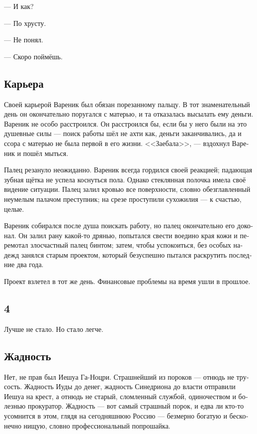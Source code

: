 \documentclass[a5paper,12pt,fleqn]{extbook}\usepackage{cooltooltips}\usepackage{polyglossia}\setdefaultlanguage[babelshorthands=true]{russian}\setotherlanguage{english}\defaultfontfeatures{Ligatures=TeX,Mapping=tex-text} \usepackage{xcolor}\definecolor{lightgray}{HTML}{bbbbbb}\color{lightgray}\newcommand{\ml}[3]{\textenglish{\textcolor{black}{#3}}}
\begin{document}
--- И как?

--- По хрусту.

--- Не понял.

--- Скоро поймёшь.


\subsection{Карьера}

Своей карьерой Вареник был обязан порезанному пальцу.
В тот знаменательный день он окончательно поругался с матерью, и та отказалась высылать ему деньги.
Вареник не особо расстроился.
Он расстроился бы, если бы у него были на это душевные силы --- поиск работы шёл не ахти как, деньги заканчивались, да и ссора с матерью не была первой в его жизни.
<<Заебала>>, --- вздохнул Вареник и пошёл мыться.

Палец резануло неожиданно.
Вареник всегда гордился своей реакцией;
падающая зубная щётка не успела коснуться пола.
Однако стеклянная полочка имела своё видение ситуации.
Палец залил кровью все поверхности, словно обезглавленный неумелым палачом преступник;
на срезе проступили сухожилия --- к счастью, целые.

Вареник собирался после душа поискать работу, но палец окончательно его доконал.
Он залил рану какой-то дрянью, попытался свести воедино края кожи и перемотал злосчастный палец бинтом;
затем, чтобы успокоиться, без особых надежд занялся старым проектом, который безуспешно пытался раскрутить последние два года.

Проект взлетел в тот же день.
Финансовые проблемы на время ушли в прошлое.


\subsection{4}

Лучше не стало.
Но стало легче.

\subsection{Жадность}

Нет, не прав был Иешуа Га-Ноцри.
Страшнейший из пороков --- отнюдь не трусость.
Жадность Иуды до денег, жадность Синедриона до власти отправили Иешуа на крест, а отнюдь не старый, сломленный службой, одиночеством и болезнью прокуратор.
Жадность --- вот самый страшный порок, и едва ли кто-то усомнится в этом, глядя на сегодняшнюю Россию --- безмерно богатую и бесконечно нищую, словно профессиональный попрошайка.
\end{document}

